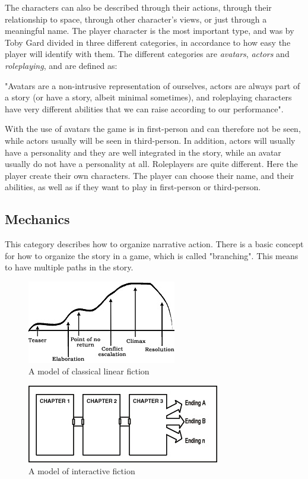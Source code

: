 The characters can also be described through their actions, through their relationship to space, through other character’s views, or just through a meaningful name. The player character is the most important type, and was by Toby Gard divided in three different categories, in accordance to how easy the player will identify with them. The different categories are \emph{avatars}, \emph{actors} and \emph{roleplaying}, and are defined as:

"Avatars are a non-intrusive representation of ourselves, actors are always part of a story (or have a story, albeit minimal sometimes), and roleplaying characters have very different abilities that we can raise according to our performance". \cite{understandingvg}

With the use of avatars the game is in first-person and can therefore not be seen, while actors usually will be seen in third-person. In addition, actors will usually have a personality and they are well integrated in the story, while an avatar usually do not have a personality at all. Roleplayers are quite different. Here the player create their own characters. The player can choose their name, and their abilities, as well as if they want to play in first-person or third-person.  

\subsection{Mechanics}
This category describes how to organize narrative action. There is a basic concept for how to organize the story in a game, which is called "branching". This means to have multiple paths in the story. 

\begin{figure}
\begin{center}
\includegraphics[scale=1.0]{linearFiction}
\caption[Classical linear fiction]{A model of classical linear fiction \cite{understandingvg}}
\label{fig:linearfiction}
\end{center}
\end{figure} 
\begin{figure}
\begin{center}
\includegraphics[scale=1.0]{interactiveFiction}
\caption[Interactive fiction]{A model of interactive fiction \cite{understandingvg}}
\label{fig:interactivefiction}
\end{center}
\end{figure} 

